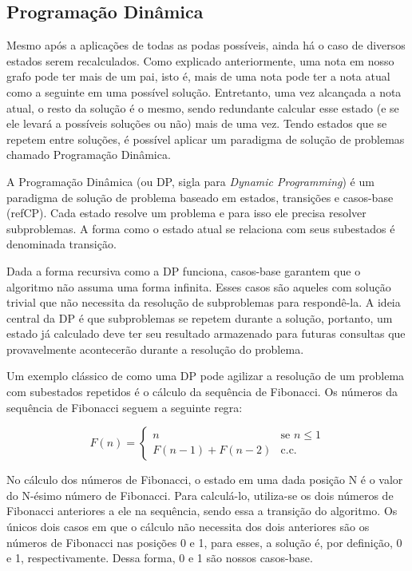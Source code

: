     \subsection[Programação Dinâmica]{Programação Dinâmica}

      Mesmo após a aplicações de todas as podas possíveis, ainda há o caso de diversos estados serem recalculados. Como explicado anteriormente, uma nota em nosso grafo pode ter mais de um pai, isto é, mais de uma nota pode ter a nota atual como a seguinte em uma possível solução. Entretanto, uma vez alcançada a nota atual, o resto da solução é o mesmo, sendo redundante calcular esse estado (e se ele levará a possíveis soluções ou não) mais de uma vez. Tendo estados que se repetem entre soluções, é possível aplicar um paradigma de solução de problemas chamado Programação Dinâmica.

      A Programação Dinâmica (ou DP, sigla para \textit{Dynamic Programming}) é um paradigma de solução de problema baseado em estados, transições e casos-base (refCP). Cada estado resolve um problema e para isso ele precisa resolver subproblemas. A forma como o estado atual se relaciona com seus subestados é denominada transição.

      Dada a forma recursiva como a DP funciona, casos-base garantem que o algoritmo não assuma uma forma infinita. Esses casos são aqueles com solução trivial que não necessita da resolução de subproblemas para respondê-la. A ideia central da DP é que subproblemas se repetem durante a solução, portanto, um estado já calculado deve ter seu resultado armazenado para futuras consultas que provavelmente acontecerão durante a resolução do problema.

      Um exemplo clássico de como uma DP pode agilizar a resolução de um problema com subestados repetidos é o cálculo da sequência de Fibonacci. Os números da sequência de Fibonacci seguem a seguinte regra:

      \[ F(n) = \left\{ \begin{array}{ll}
         n & \mbox{se $n \leqslant 1$}\\
        F(n-1) + F(n-2) & \mbox{c.c.}\end{array} \right. \]

      No cálculo dos números de Fibonacci, o estado em uma dada posição N é o valor do N-ésimo número de Fibonacci. Para calculá-lo, utiliza-se os dois números de Fibonacci anteriores a ele na sequência, sendo essa a transição do algoritmo. Os únicos dois casos em que o cálculo não necessita dos dois anteriores são os números de Fibonacci nas posições 0 e 1, para esses, a solução é, por definição, 0 e 1, respectivamente. Dessa forma, 0 e 1 são nossos casos-base.

